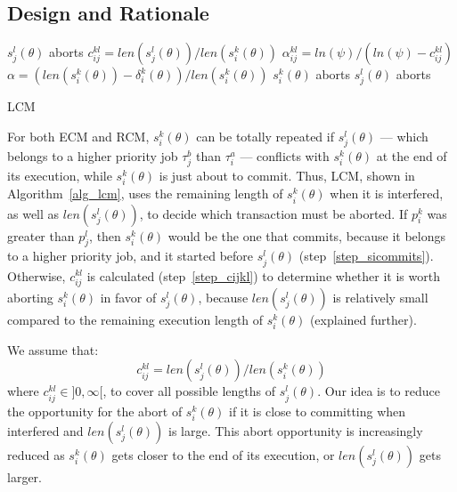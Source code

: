 \documentclass[a4paper,english]{article}
\begin{document}
\subsection{\label{sec 9.1} Design and Rationale}

\begin{algorithm}
\footnotesize{
\LinesNumbered
{}
	{$s_j^l(\theta)$ aborts\label{step_sicommits}\;}
	{$c_{ij}^{kl}=len(s_j^l(\theta))/len(s_i^k(\theta))$\label{step_cijkl}\;
	$\alpha_{ij}^{kl}=ln(\psi)/(ln(\psi)-c_{ij}^{kl})$\label{step_alphaijkl}\;
	$\alpha=\left(len(s_i^k(\theta))-\delta_i^k(\theta)\right)/len(s_i^k(\theta))$\;
	{$s_i^k(\theta)$ aborts\label{step_siaborts}\;}
	{$s_j^l(\theta)$ aborts\label{step_sjaborts}\;}
	}
	}
\caption{LCM}
\label{alg_lcm}
\end{algorithm}

For both ECM and RCM, $s_{i}^{k}(\theta)$ can be totally repeated if $s_{j}^{l}(\theta)$ --- which belongs to a higher priority job $\tau_{j}^b$ than $\tau_{i}^a$ --- conflicts with $s_{i}^{k}(\theta)$
at the end of its execution, while $s_{i}^{k}(\theta)$ is just about
to commit. Thus, LCM, shown in Algorithm~\ref{alg_lcm}, uses the remaining length of $s_{i}^{k}(\theta)$ when it is interfered,
as well as $len(s_{j}^{l}(\theta))$, to decide which transaction must be aborted. If $p_i^k$ was greater than $p_j^l$, then $s_i^k(\theta)$ would be the one that commits, because it belongs to a higher priority job, and it started before $s_j^l(\theta)$ (step~\ref{step_sicommits}). Otherwise, $c_{ij}^{kl}$ is calculated (step~\ref{step_cijkl}) to determine whether it is worth aborting $s_i^k(\theta)$ in favor of $s_j^l(\theta)$, because $len(s_j^l(\theta))$ is relatively small compared to the remaining execution length of $s_i^k(\theta)$  (explained further).

We assume that:
\begin{equation}
c_{ij}^{kl}=len(s_{j}^{l}(\theta))/len(s_{i}^{k}(\theta))
\label{cm_eq}\end{equation}
where $c_{ij}^{kl}\in]0,\infty[$, to cover all possible lengths of $s_{j}^{l}(\theta)$.
Our idea is to reduce the opportunity for the abort of $s_{i}^{k}(\theta)$ if it is close to committing when interfered and $len(s_{j}^{l}(\theta))$ is large. This abort opportunity is increasingly reduced as $s_{i}^{k}(\theta)$ gets closer to the end of its execution, or $len(s_{j}^{l}(\theta))$ gets larger. 
\end{document}
